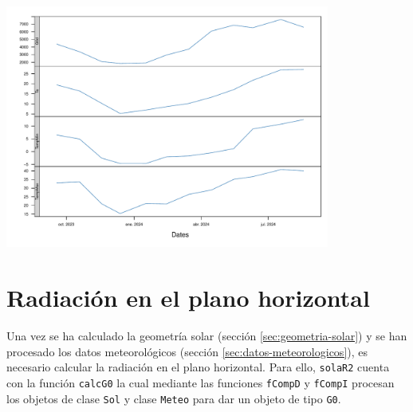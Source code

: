 \begin{center}
\includegraphics[width=0.8\textwidth]{figuras/codigo-readsiar.pdf}
\end{center}

\section{Radiación en el plano horizontal}
\label{sec:orgef7dbf5}
\label{sec:radiacion-plano-horizontal}
Una vez se ha calculado la geometría solar (sección \ref{sec:geometria-solar}) y se han procesado los datos meteorológicos (sección \ref{sec:datos-meteorologicos}), es necesario calcular la radiación en el plano horizontal. Para ello, \texttt{solaR2} cuenta con la función \texttt{calcG0} la cual mediante las funciones \texttt{fCompD} y \texttt{fCompI} procesan los objetos de clase \texttt{Sol} y clase \texttt{Meteo} para dar un objeto de tipo \texttt{G0}.

